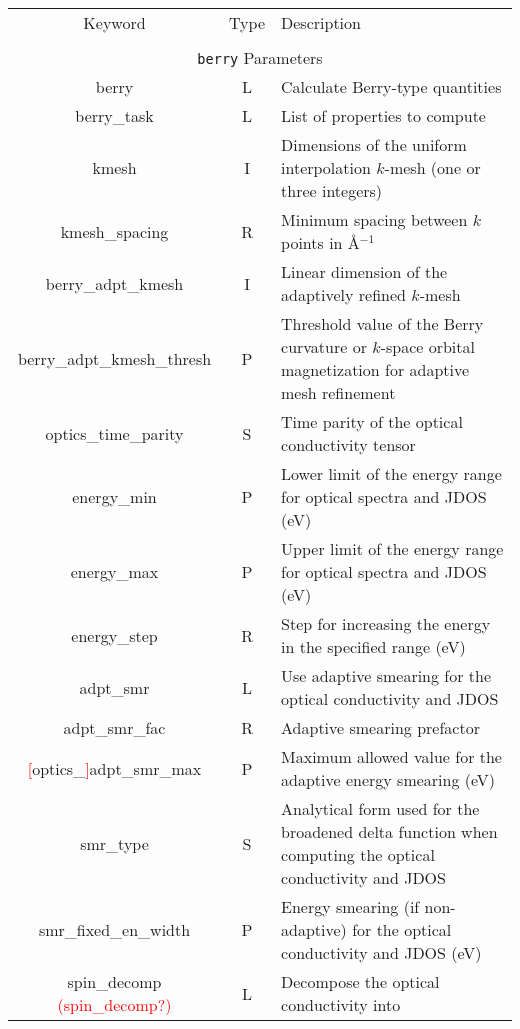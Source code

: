 \begin{table}[hH!]
\begin{center}
\begin{tabular}{|c|c|p{6cm}|}
  \hline
  Keyword & Type & Description \\
  &      &             \\
  \hline\hline
  \multicolumn{3}{|c|}{{\tt berry} Parameters} \\
  \hline
  {\sc berry}  & L & Calculate Berry-type quantities \\
  {\sc berry\_task}& L  & List of properties to compute \\
  {\sc [berry\_]kmesh} & I & Dimensions of the uniform interpolation $k$-mesh 
  (one or three integers)\\ 
  {\sc [berry\_]kmesh\_spacing}& R & Minimum spacing between $k$ points in 
  \AA$^{-1}$\\
  {\sc berry\_adpt\_kmesh} & I & Linear dimension of the adaptively refined 
  $k$-mesh\\ 
  {\sc berry\_adpt\_kmesh\_thresh} & P & Threshold value of the Berry 
  curvature or $k$-space orbital magnetization for adaptive mesh refinement\\ 
  {\sc optics\_time\_parity}& S & Time parity of the optical conductivity tensor\\ 
  {\sc [optics\_]energy\_min} & P & Lower limit of the energy range for
  optical spectra and JDOS (eV) \\
  {\sc [optics\_]energy\_max}& P & Upper limit of the energy range for
  optical spectra and JDOS (eV) \\
  {\sc [optics\_]energy\_step}& R &  Step for increasing the energy in the 
  specified range (eV)\\
  {\sc [optics\_]adpt\_smr} & L & Use adaptive smearing for the 
  optical conductivity and JDOS \\
  {\sc [optics\_]adpt\_smr\_fac} & R & Adaptive smearing prefactor \\
  {\sc \textcolor{red}{[}optics\_\textcolor{red}{]}adpt\_smr\_max} & P & Maximum allowed value for the 
  adaptive energy smearing (eV) \\
  {\sc [optics\_]smr\_type} & S & Analytical form used for the broadened delta function
  when computing the optical conductivity and JDOS\\  
  {\sc [optics\_]smr\_fixed\_en\_width} & P  & Energy smearing (if non-adaptive)
  for the optical conductivity and JDOS (eV) \\
  {\sc spin\_decomp} \textcolor{red}{({\sc [optics\_]spin\_decomp}?)}& L & Decompose the optical conductivity into

\end{tabular}
\end{center}
\end{table}

